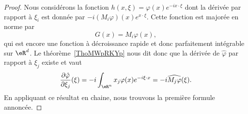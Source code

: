 \begin{proof}
	Nous considérons la fonction \( h(x,\xi)=\varphi(x) e^{-ix\cdot \xi}\) dont la dérivée par rapport à \( \xi_i\) est donnée par \( -i(M_{i}\varphi)(x) e^{x\cdot \xi}\). Cette fonction est majorée en norme par
	\begin{equation}
		G(x)=M_i\varphi(x),
	\end{equation}
	qui est encore une fonction à décroissance rapide et donc parfaitement intégrable sur \( \eR^d\). Le théorème~\ref{ThoMWpRKYp} nous dit donc que la dérivée de \( \hat \varphi\) par rapport à \( \xi_j\) existe et vaut
	\begin{equation}
		\frac{ \partial \hat\varphi }{ \partial \xi_j }(\xi)=-i\int_{\eR^n}x_j\varphi(x) e^{-i\xi\cdot x}=-i\widehat{M_j\varphi}(\xi).
	\end{equation}
	En appliquant ce résultat en chaine, nous trouvons la première formule annoncée.


\end{proof}
